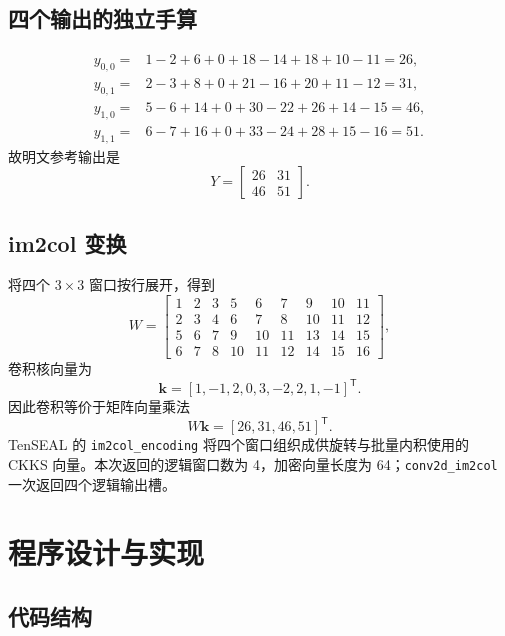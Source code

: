 \documentclass[UTF8,a4paper,zihao=-4]{ctexart}
\begin{document}
\subsection{四个输出的独立手算}

\begin{align*}
y_{0,0}={}&1-2+6+0+18-14+18+10-11=26,\\
y_{0,1}={}&2-3+8+0+21-16+20+11-12=31,\\
y_{1,0}={}&5-6+14+0+30-22+26+14-15=46,\\
y_{1,1}={}&6-7+16+0+33-24+28+15-16=51.
\end{align*}
故明文参考输出是
\[
Y=\begin{bmatrix}26&31\\46&51\end{bmatrix}.
\]

\subsection{im2col 变换}

将四个 $3\times3$ 窗口按行展开，得到
\[
W=\begin{bmatrix}
1&2&3&5&6&7&9&10&11\\
2&3&4&6&7&8&10&11&12\\
5&6&7&9&10&11&13&14&15\\
6&7&8&10&11&12&14&15&16
\end{bmatrix},
\]
卷积核向量为
\[
\boldsymbol{k}=[1,-1,2,0,3,-2,2,1,-1]^{\mathsf T}.
\]
因此卷积等价于矩阵向量乘法
\[
W\boldsymbol{k}=[26,31,46,51]^{\mathsf T}.
\]
TenSEAL 的 \texttt{im2col\_encoding} 将四个窗口组织成供旋转与批量内积使用的 CKKS 向量。本次返回的逻辑窗口数为 4，加密向量长度为 64；\texttt{conv2d\_im2col} 一次返回四个逻辑输出槽。

\section{程序设计与实现}

\subsection{代码结构}
\end{document}

